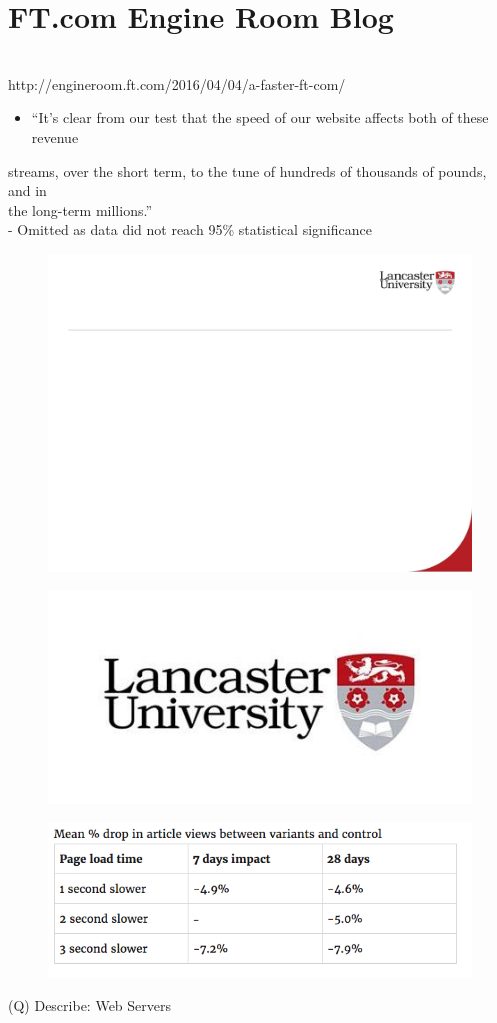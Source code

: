 \documentclass[12pt]{article}
\begin{document}
\section{FT.com Engine Room Blog}
\\
http://engineroom.ft.com/2016/04/04/a-faster-ft-com/\\
\begin{itemize}
  \item “It’s clear from our test that the speed of our website affects both of these revenue 
\end{itemize}
streams, over the short term, to the tune of hundreds of thousands of pounds, and in \\
the long-term millions.”\\
- Omitted as data did not reach 95\% statistical significance\\
\begin{figure}[H]
\includegraphics[width=0.5\linewidth]{page17-image-1.png}
\end{figure}
\begin{figure}[H]
\includegraphics[width=0.5\linewidth]{page17-image-2.png}
\end{figure}
\begin{figure}[H]
\includegraphics[width=0.5\linewidth]{page17-image-3.png}
\end{figure}
\clearpage
(Q)
Describe: Web Servers
\clearpage
\end{document}

